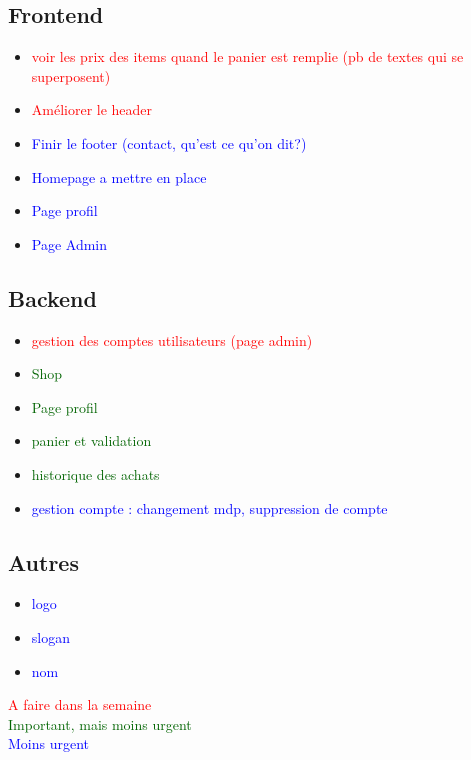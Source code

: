 \documentclass[10pt,a4paper]{report}
\begin{document}
\subsection*{Frontend}
\begin{itemize}
        \item \textcolor{red}{voir les prix des items quand le panier est remplie (pb de textes qui se superposent)}
        \item \textcolor{red}{Améliorer le header}
        \item \textcolor{blue}{Finir le footer (contact, qu’est ce qu’on dit?)}
        \item \textcolor{blue}{Homepage a mettre en place}
        \item \textcolor{blue}{Page profil}
        \item \textcolor{blue}{Page Admin}
\end{itemize}

\subsection*{Backend}
\begin{itemize}
        \item \textcolor{red}{gestion des comptes utilisateurs (page admin)}
        \item \textcolor{darkgreen}{Shop}
        \item \textcolor{darkgreen}{Page profil}
        \item \textcolor{darkgreen}{panier et validation}
        \item \textcolor{darkgreen}{historique des achats}
        \item \textcolor{blue}{gestion compte : changement mdp, suppression de compte}
\end{itemize}

\subsection*{Autres}
\begin{itemize}
        \item \textcolor{blue}{logo}
        \item \textcolor{blue}{slogan}
        \item \textcolor{blue}{nom}
\end{itemize}

\textcolor{red}{A faire dans la semaine} \\
\textcolor{darkgreen}{Important, mais moins urgent} \\
\textcolor{blue}{Moins urgent}
\end{document}
